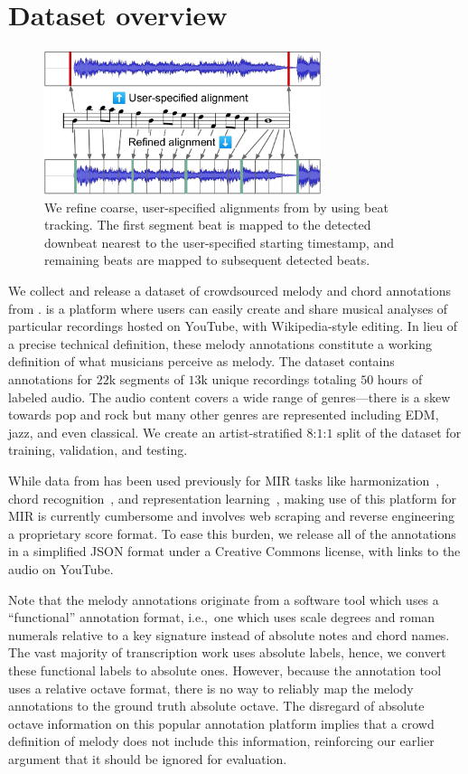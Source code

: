 \section{Dataset overview}
\label{sec:dataset}

\begin{figure}
    \centering
    \includegraphics[width=8.1cm]{figs/alignment.pdf}
    \caption{We refine coarse, user-specified alignments from \hooktheory{} by using beat tracking. The first segment beat is mapped to the detected downbeat nearest to the user-specified starting timestamp, and remaining beats are mapped to subsequent detected beats.}
 \label{fig:alignment}
\end{figure}

We collect and release a dataset of crowdsourced melody and chord annotations from \hooktheory{}. 
\hooktheory{} is a platform where users can easily create and share musical analyses of particular recordings hosted on YouTube, with Wikipedia-style editing. 
In lieu of a precise technical definition, these melody annotations constitute a working definition of what musicians perceive as melody. 
The dataset contains annotations for $22$k segments of $13$k unique recordings totaling $50$ hours of labeled audio. 
The audio content covers a wide range of genres---there is a skew towards pop and rock but many other genres are represented including EDM, jazz, and even classical. 
We create an artist-stratified $8$:$1$:$1$ split of the dataset for training, validation, and testing.

While data from \hooktheory{} has been used previously for MIR tasks like 
harmonization~\cite{chen2021surprisenet,yeh2021automatic}, 
chord recognition~\cite{jiang2019mirex}, and 
representation learning~\cite{jiang2020transformer}, 
making use of this platform for MIR is currently cumbersome and involves web scraping and reverse engineering a proprietary score format. 
To ease this burden, we release all of the annotations in a simplified JSON format under a Creative Commons license, with links to the audio on YouTube.

Note that the melody annotations originate from a software tool which uses a ``functional'' annotation format, i.e.,~one which uses scale degrees and roman numerals relative to a key signature instead of absolute notes and chord names. 
The vast majority of transcription work uses absolute labels, hence, we convert these functional labels to absolute ones. 
However, because the annotation tool uses a relative octave format, there is no way to reliably map the melody annotations to the ground truth absolute octave. 
The disregard of absolute octave information on this popular annotation platform implies that a crowd definition of melody does not include this information, reinforcing our earlier argument that it should be ignored for evaluation.

